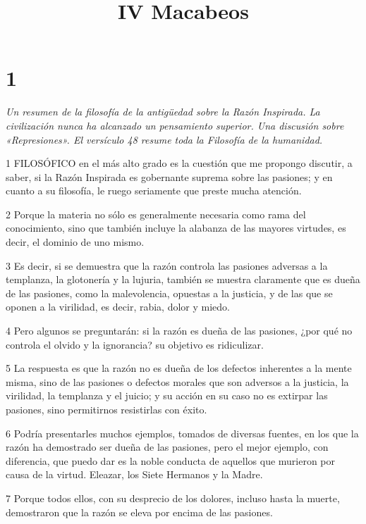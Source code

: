 

\title{IV Macabeos}

\chapter{1}

\par \textit{Un resumen de la filosofía de la antigüedad sobre la Razón Inspirada. La civilización nunca ha alcanzado un pensamiento superior. Una discusión sobre «Represiones». El versículo 48 resume toda la Filosofía de la humanidad.}

\par 1 FILOSÓFICO en el más alto grado es la cuestión que me propongo discutir, a saber, si la Razón Inspirada es gobernante suprema sobre las pasiones; y en cuanto a su filosofía, le ruego seriamente que preste mucha atención.

\par 2 Porque la materia no sólo es generalmente necesaria como rama del conocimiento, sino que también incluye la alabanza de las mayores virtudes, es decir, el dominio de uno mismo.

\par 3 Es decir, si se demuestra que la razón controla las pasiones adversas a la templanza, la glotonería y la lujuria, también se muestra claramente que es dueña de las pasiones, como la malevolencia, opuestas a la justicia, y de las que se oponen a la virilidad, es decir, rabia, dolor y miedo.

\par 4 Pero algunos se preguntarán: si la razón es dueña de las pasiones, ¿por qué no controla el olvido y la ignorancia? su objetivo es ridiculizar.

\par 5 La respuesta es que la razón no es dueña de los defectos inherentes a la mente misma, sino de las pasiones o defectos morales que son adversos a la justicia, la virilidad, la templanza y el juicio; y su acción en su caso no es extirpar las pasiones, sino permitirnos resistirlas con éxito.

\par 6 Podría presentarles muchos ejemplos, tomados de diversas fuentes, en los que la razón ha demostrado ser dueña de las pasiones, pero el mejor ejemplo, con diferencia, que puedo dar es la noble conducta de aquellos que murieron por causa de la virtud. Eleazar, los Siete Hermanos y la Madre.

\par 7 Porque todos ellos, con su desprecio de los dolores, incluso hasta la muerte, demostraron que la razón se eleva por encima de las pasiones.

